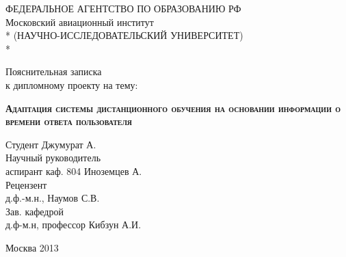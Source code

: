 \begin{titlepage}
\newpage
\begin{center}
ФЕДЕРАЛЬНОЕ АГЕНТСТВО ПО ОБРАЗОВАНИЮ РФ \\
\vspace{1cm}
Московский авиационный институт \\*
(НАУЧНО-ИССЛЕДОВАТЕЛЬСКИЙ УНИВЕРСИТЕТ) \\*
\hrulefill
\end{center}
 

\vspace{6em}

\begin{center}
\Large Пояснительная записка \\ к дипломному проекту на тему:
\end{center}

\vspace{2.5em}
 
\begin{center}
\textsc{\textbf{Адаптация системы дистанционного обучения  \linebreak на основании информации о времени ответа пользователя}}
\end{center}

\vspace{5em}
 
\begin{flushleft}
Студент \hrulefill Джумурат А. \\
\vspace{1.5em}
Научный руководитель \\
аспирант каф. 804 \hrulefill Иноземцев А.\\
\vspace{1.5em}
Рецензент \\
д.ф.-м.н., \hrulefill Наумов С.В.\\
\vspace{1.5em}
Зав. кафедрой  \\
д.ф-м.н, профессор \hrulefill Кибзун А.И.
\end{flushleft}
 
\vspace{\fill}

\begin{center}
Москва 2013
\end{center}

\end{titlepage} 
